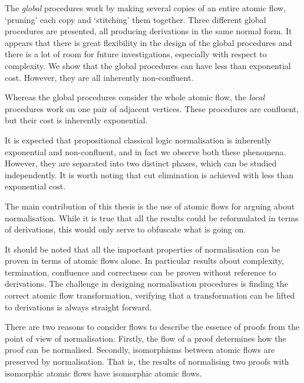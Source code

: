 
The \emph{global} procedures work by making several copies of an entire atomic flow, `pruning' each copy and `stitching' them together. Three different global procedures are presented, all producing derivations in the same normal form. It appears that there is great flexibility in the design of the global procedures and there is a lot of room for future investigations, especially with respect to complexity. We show that the global procedures can have less than exponential cost. However, they are all inherently non-confluent.

Whereas the global procedures consider the whole atomic flow, the \emph{local} procedures work on one pair of adjacent vertices. These procedures are confluent, but their cost is inherently exponential.

It is expected that propositional classical logic normalisation is inherently exponential and non-confluent, and in fact we observe both these phenomena. However, they are separated into two distinct phases, which can be studied independently. It is worth noting that cut elimination is achieved with less than exponential cost.

The main contribution of this thesis is the use of atomic flows for arguing about normalisation. While it is true that all the results could be reformulated in terms of derivations, this would only serve to obfuscate what is going on.

It should be noted that all the important properties of normalisation can be proven in terms of atomic flows alone. In particular results about complexity, termination, confluence and correctness can be proven without reference to derivations. The challenge in designing normalisation procedures is finding the correct atomic flow transformation, verifying that a transformation can be lifted to derivations is always straight forward.

There are two reasons to consider flows to describe the essence of proofs from the point of view of normalisation: Firstly, the flow of a proof determines how the proof can be normalised. Secondly, isomorphisms between atomic flows are preserved by normalisation. That is, the results of normalising two proofs with isomorphic atomic flows have isomorphic atomic flows.

